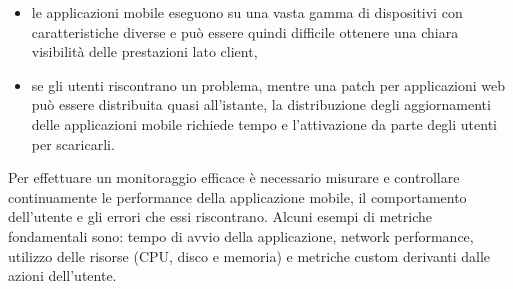 \begin{itemize}
    \item le applicazioni mobile eseguono su una vasta gamma di dispositivi con caratteristiche diverse e può essere quindi difficile ottenere una chiara visibilità delle prestazioni lato client,
    \item se gli utenti riscontrano un problema, mentre una patch per applicazioni web può essere distribuita quasi all'istante, la distribuzione degli aggiornamenti delle applicazioni mobile richiede tempo e l'attivazione da parte degli utenti per scaricarli.
\end{itemize}

Per effettuare un monitoraggio efficace è necessario misurare e controllare continuamente le performance della applicazione mobile, il comportamento dell'utente e gli errori che essi riscontrano. Alcuni esempi di metriche fondamentali sono: tempo di avvio della applicazione, network performance, utilizzo delle risorse (CPU, disco e memoria) e metriche custom derivanti dalle azioni dell'utente.